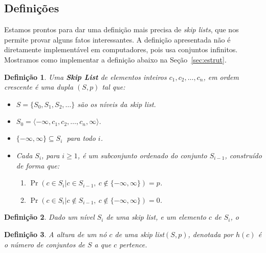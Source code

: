 \documentclass[paper=a4, fontsize=11pt]{scrartcl} %
\newtheorem{definition}{Definição}
\numberwithin{equation}{section}
\numberwithin{figure}{section}
\numberwithin{table}{section}
\numberwithin{definition}{section}
\numberwithin{theorem}{section}
\numberwithin{property}{section}
\numberwithin{proposition}{section}
\newcommand{\sls}{\textit{skip lists}\xspace}
\renewcommand{\sl}{\textit{skip list}\xspace}
\begin{document}
\FloatBarrier
\subsection{Definições}

Estamos prontos para dar uma definição mais precisa de \sls , que nos permite provar alguns fatos interessantes.
A definição apresentada não é diretamente implementável em computadores, pois usa conjuntos infinitos. Mostramos
como implementar a definição abaixo na Seção~\ref{sec:estrut}.


\begin{definition}
Uma \textbf{\emph{Skip List}} de elementos inteiros $c_1, c_2, \ldots, c_n$, em ordem crescente é uma dupla $\left( S, p \right)$ tal que:

\begin{itemize}

\item $S = \{S_0, S_1, S_2, \ldots \}$ são os níveis da \sl.

\item $S_0 = \langle -\infty, c_1, c_2, \ldots, c_n, \infty \rangle.$

\item $\{-\infty, \infty\} \subseteq S_i \ $ para todo $i$.

\item Cada $S_i$, para $i \geq 1$, é um subconjunto ordenado do conjunto $S_{i-1}$, construído de forma que:
  \begin{enumerate}[noitemsep]
    \item $\Pr(c \in S_i | c \in S_{i-1} ,\  c \notin \{-\infty, \infty\}) = p$.
    \item  $\Pr(c \in S_i | c \notin S_{i-1}, \ c \notin \{-\infty, \infty\}) = 0$.
  \end{enumerate}

\end{itemize}

\end{definition}


\begin{definition}
Dado um nível $S_i$ de uma \sl, e um elemento $c$ de $S_i$, o 
\end{definition}


\begin{definition}

A altura de um nó $c$ de uma \sl $( S, p )$, denotada por $h(c)$ é o número de conjuntos de $S$ a que $c$ pertence.

\end{definition}
\end{document}
